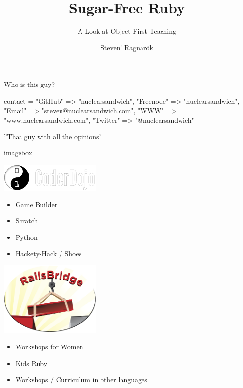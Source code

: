 \documentclass[20pt]{beamer}
\author{Steven! Ragnarök}
\title{Sugar-Free Ruby}
\subtitle{A Look at Object-First Teaching}
\begin{document}
\begin{frame}
	\titlepage
\end{frame}

\begin{frame}[fragile]
	\begin{center}
		{Who is this guy?}
		\vspace{1cm}

		\insertauthor
	\end{center}
	\begin{ruby10pt}
contact = {
  "GitHub"   =>        "nuclearsandwich",
  "Freenode" =>        "nuclearsandwich",
  "Email"    => "steven@nuclearsandwich.com",
  "WWW"      =>    "www.nuclearsandwich.com",
  "Twitter"  =>       "@nuclearsandwich"
}
	\end{ruby10pt}

	\begin{center}
		''That guy with all the opinions''
	\end{center}
\end{frame}

\begin{frame}
	\begin{beamercolorbox}{imagebox}
		\vspace{5mm}\par
		\centering\includegraphics[width=5cm]{coderdojo_logo}\par
		\vspace{5mm}\par
	\end{beamercolorbox}
	\begin{itemize}
		\item Game Builder
		\item Scratch
		\item Python
		\item Hackety-Hack / Shoes
	\end{itemize}
\end{frame}

\begin{frame}
	\centering\includegraphics[width=5cm]{railsbridge_logo}
	\begin{itemize}
		\item Workshops for Women
		\item Kids Ruby
		\item Workshops / Curriculum in other languages
	\end{itemize}
\end{frame}
\end{document}
